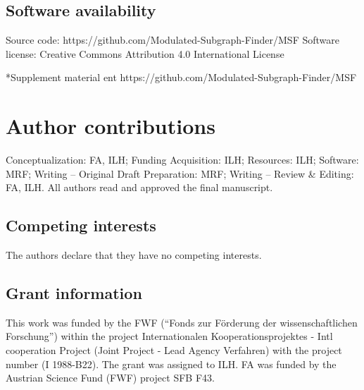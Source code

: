 \documentclass[10pt,a4paper,twocolumn]{article}
\begin{document}
\subsection*{Software availability}

\noindent
Source code: \newline
https://github.com/Modulated-Subgraph-Finder/MSF \newline Software
license: Creative Commons Attribution 4.0 International License


*{Supplement material}
ent
https://github.com/Modulated-Subgraph-Finder/MSF 

\section*{Author contributions}
Conceptualization: FA, ILH; Funding Acquisition: ILH; Resources: ILH;
Software: MRF; Writing – Original Draft Preparation: MRF; Writing – Review
\& Editing: FA, ILH. All authors read and approved the final manuscript.

\subsection*{Competing interests}

The authors declare that they have no competing interests.

\subsection*{Grant information}

This work was funded by the FWF (“Fonds zur F{\"o}rderung der
wissenschaftlichen Forschung”) within the project Internationalen
Kooperationsprojektes - Intl cooperation Project (Joint Project - Lead
Agency Verfahren) with the project number (I 1988-B22). The grant was
assigned to ILH. FA was funded by the Austrian Science Fund (FWF) project
SFB F43.


{\small
}

\bigskip



\begin{figure}
	\centering

\end{figure}
\end{document}
